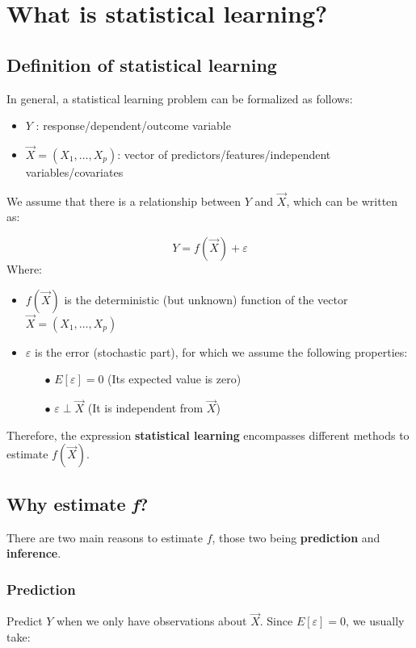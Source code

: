 \chapter{What is statistical learning?}
  
  \section{Definition of statistical learning}
    In general, a statistical learning problem can be formalized as follows:

    \begin{itemize}
      \item $Y$ : response/dependent/outcome variable
      \item $\vec{X} = (X_1, \dots, X_p)$: vector of predictors/features/independent variables/covariates
    \end{itemize}
    We assume that there is a relationship between $Y$ and $\vec{X}$, which can be written as:

    $$Y = f(\vec{X}) + \varepsilon $$
    Where:
    \begin{itemize}
      \item $f(\vec{X})$ is the deterministic (but unknown) function of the vector $\vec{X} = (X_1, \dots, X_p)$
      \item $\varepsilon$ is the error (stochastic part), for which we assume the following properties:
      \begin{itemize}
        \item[$\bullet$] $E[\varepsilon] = 0$ (Its expected value is zero)
        \item[$\bullet$] $\varepsilon \perp \vec{X}$ (It is independent from $\vec{X}$)
      \end{itemize}
    \end{itemize}
    Therefore, the expression \textbf{statistical learning} encompasses different methods to estimate $f(\vec{X})$. 

  \section{Why estimate \textit{f}?}
    There are two main reasons to estimate $f$, those two being \textbf{prediction} and \textbf{inference}.
  
    \subsection{Prediction}
      Predict $Y$ when we only have observations about $\vec{X}$. Since $E[\varepsilon] = 0$, we usually take:

